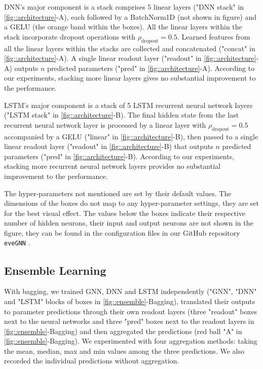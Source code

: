 {DNN's major component is a stack comprises 5 linear layers ("DNN stack" in \autoref{fig::architecture}-A), each followed by a BatchNorm1D (not shown in figure) and a GELU (the orange band within the boxes). All the linear layers within the stack incorporate dropout operations with $\rho_{\text{dropout}}=0.5$. Learned features from all the linear layers within the stacks are collected and concatenated ("concat" in \autoref{fig::architecture}-A). A single linear readout layer ("readout" in \autoref{fig::architecture}-A) outputs $n$ predicted parameters ("pred" in \autoref{fig::architecture}-A). According to our experiments, stacking more linear layers gives no substantial improvement to the performance.

LSTM's major component is a stack of 5 LSTM recurrent neural network layers ("LSTM stack" in \autoref{fig::architecture}-B). The final hidden state from the last recurrent neural network layer is processed by a linear layer with $\rho_{\text{dropout}}=0.5$ accompanied by a GELU ("linear" in \autoref{fig::architecture}-B), then passed to a single linear readout layer ("readout" in \autoref{fig::architecture}-B) that outputs $n$ predicted parameters ("pred" in \autoref{fig::architecture}-B). According to our experiments, stacking more recurrent neural network layers provides no substantial improvement to the performance.

The hyper-parameters not mentioned are set by their default values. The dimensions of the boxes do not map to any hyper-parameter settings, they are set for the best visual effect. The values below the boxes indicate their respective number of hidden neurons, their input and output neurons are not shown in the figure, they can be found in the configuration files in our GitHub repository \texttt{eveGNN} \citep{qin_evegnn_2023}.

\clearpage
\subsection{Ensemble Learning}
\label{appendix::ensemble}
With bagging, we trained GNN, DNN and LSTM independently ("GNN", "DNN" and "LSTM" blocks of boxes in \autoref{fig::ensemble}-Bagging), translated their outputs to parameter predictions through their own readout layers (three "readout" boxes next to the neural networks and three "pred" boxes next to the readout layers in \autoref{fig::ensemble}-Bagging) and then aggregated the predictions (red ball "A" in \autoref{fig::ensemble}-Bagging). We experimented with four aggregation methods: taking the mean, median, max and min values among the three predictions. We also recorded the individual predictions without aggregation.

}
